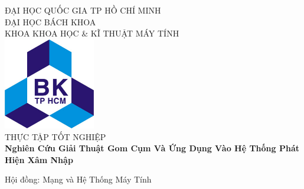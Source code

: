 


\begin{titlepage}

\newcommand{\HRule}{\rule{\linewidth}{0.5mm}} %

\center %
 

\textsc{\Large ĐẠI HỌC QUỐC GIA TP HỒ CHÍ MINH}\\[0.25cm] %
\textsc{\Large ĐẠI HỌC BÁCH KHOA}\\[0.25cm] %
\textsc{\large KHOA KHOA HỌC \& KĨ THUẬT MÁY TÍNH}\\[0.4cm] %

\includegraphics[width=0.3\textwidth]{BK.jpg}\\[0.4cm]

\textsc{\Large{THỰC TẬP TỐT NGHIỆP}}\\[0.5cm] 

{ \Large \bfseries Nghiên Cứu Giải Thuật Gom Cụm Và Ứng Dụng Vào Hệ
Thống Phát Hiện Xâm Nhập}\\[0.7cm] %
\begin{flushright}
\large Hội đồng: Mạng và Hệ Thống Máy Tính
\end{flushright}
 


\end{titlepage}
